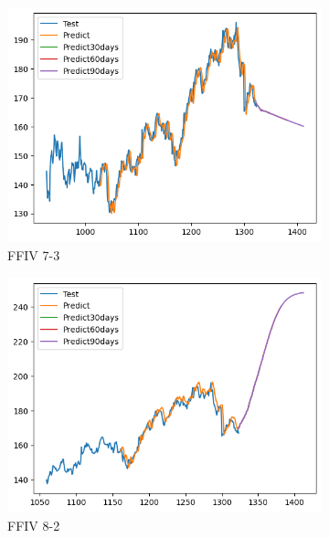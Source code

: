 \documentclass{ieeeojies}
\begin{document}
\begin{figure}[H]
    \centering
    \begin{subfigure}[h]{0.33\linewidth}
        \centering
        \includegraphics[width=\linewidth]{RNN Plot/RNN_FFIV_7_3.png}
        \caption{FFIV 7-3}
        \label{fig:ffiv-7-3}
    \end{subfigure}%
    \hfill
    \begin{subfigure}[h]{0.33\linewidth}
        \centering
        \includegraphics[width=\linewidth]{RNN Plot/RNN_FFIV_8_2.png}
        \caption{FFIV 8-2}
        \label{fig:ffiv-8-2}
    \end{subfigure}%
    \hfill
    \begin{subfigure}[h]{0.33\linewidth}

\end{subfigure}
\end{figure}
\end{document}

